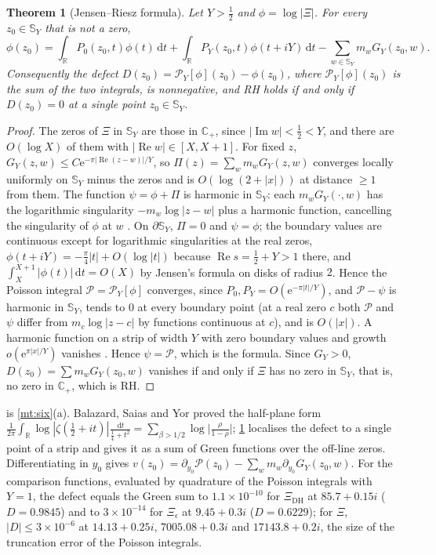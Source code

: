 \documentclass[11pt]{article}
\newtheorem{theorem}{Theorem}[section]
\theoremstyle{definition}\newtheorem{definition}[theorem]{Definition}
\theoremstyle{remark}\newtheorem{remark}[theorem]{Remark}
\newcommand{\R}{\mathbb R}\newcommand{\C}{\mathbb C}\newcommand{\N}{\mathbb N}
\newcommand{\dd}{\,\mathrm d}\newcommand{\e}{\mathrm e}
\renewcommand{\Re}{\operatorname{Re}}\renewcommand{\Im}{\operatorname{Im}}
\begin{document}
\begin{theorem}[Jensen--Riesz formula]\label{thm:jensen}
Let $Y>\frac12$ and $\phi=\log|\Xi|$. For every $z_0\in\mathbb S_Y$ that is not a zero,
\[
\phi(z_0)=\int_\R P_0(z_0,t)\phi(t)\dd t+\int_\R P_Y(z_0,t)\phi(t+iY)\dd t-\sum_{w\in\mathbb S_Y}m_wG_Y(z_0,w).
\]
Consequently the defect $D(z_0)=\mathcal P_Y[\phi](z_0)-\phi(z_0)$, where $\mathcal P_Y[\phi](z_0)$ is the sum of the two integrals, is nonnegative, and RH holds if and only if $D(z_0)=0$ at a single point $z_0\in\mathbb S_Y$.
\end{theorem}
\begin{proof}
The zeros of $\Xi$ in $\mathbb S_Y$ are those in $\C_+$, since $|\Im w|<\frac12<Y$, and there are $O(\log X)$ of them with $|\Re w|\in[X,X+1]$. For fixed $z$, $G_Y(z,w)\le C\e^{-\pi|\Re(z-w)|/Y}$, so $\Pi(z)=\sum_wm_wG_Y(z,w)$ converges locally uniformly on $\mathbb S_Y$ minus the zeros and is $O(\log(2+|x|))$ at distance $\ge1$ from them. The function $\psi=\phi+\Pi$ is harmonic in $\mathbb S_Y$: each $m_wG_Y(\cdot,w)$ has the logarithmic singularity $-m_w\log|z-w|$ plus a harmonic function, cancelling the singularity of $\phi$ at $w$ \cite[Ch.~4]{Ransford}. On $\partial\mathbb S_Y$, $\Pi=0$ and $\psi=\phi$; the boundary values are continuous except for logarithmic singularities at the real zeros, $\phi(t+iY)=-\frac\pi4|t|+O(\log|t|)$ because $\Re s=\frac12+Y>1$ there, and $\int_X^{X+1}|\phi(t)|\dd t=O(X)$ by Jensen's formula on disks of radius $2$. Hence the Poisson integral $\mathcal P=\mathcal P_Y[\phi]$ converges, since $P_0,P_Y=O(\e^{-\pi|t|/Y})$, and $\mathcal P-\psi$ is harmonic in $\mathbb S_Y$, tends to $0$ at every boundary point (at a real zero $c$ both $\mathcal P$ and $\psi$ differ from $m_c\log|z-c|$ by functions continuous at $c$), and is $O(|x|)$. A harmonic function on a strip of width $Y$ with zero boundary values and growth $o(\e^{\pi|x|/Y})$ vanishes \cite{Ransford}. Hence $\psi=\mathcal P$, which is the formula. Since $G_Y>0$, $D(z_0)=\sum m_wG_Y(z_0,w)$ vanishes if and only if $\Xi$ has no zero in $\mathbb S_Y$, that is, no zero in $\C_+$, which is RH.
\end{proof}

 is \cref{mt:six}(a). Balazard, Saias and Yor \cite{BSY} proved the half-plane form $\frac1{2\pi}\int_\R\log|\zeta(\frac12+it)|\frac{\dd t}{\frac14+t^2}=\sum_{\beta>1/2}\log\bigl|\frac\rho{1-\rho}\bigr|$; \cref{thm:jensen} localises the defect to a single point of a strip and gives it as a sum of Green functions over the off-line zeros. Differentiating in $y_0$ gives $v(z_0)=\partial_{y_0}\mathcal P(z_0)-\sum_wm_w\partial_{y_0}G_Y(z_0,w)$. For the comparison functions, evaluated by quadrature of the Poisson integrals with $Y=1$, the defect equals the Green sum to $1.1\times10^{-10}$ for $\Xi_{\mathrm{DH}}$ at $85.7+0.15i$ ($D=0.9845$) and to $3\times10^{-14}$ for $\Xi_\epsilon$ at $9.45+0.3i$ ($D=0.6229$); for $\Xi$, $|D|\le3\times10^{-6}$ at $14.13+0.25i$, $7005.08+0.3i$ and $17143.8+0.2i$, the size of the truncation error of the Poisson integrals.
\end{document}
